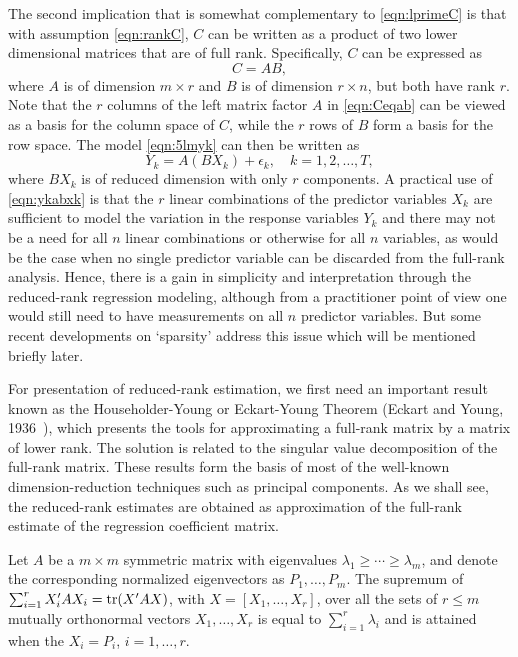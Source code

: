 The second implication that is somewhat complementary to \eqref{eqn:lprimeC} is that with assumption \eqref{eqn:rankC}, $C$ can be written as a product of two lower dimensional matrices that are of full rank. Specifically, $C$ can be expressed as
	\begin{equation} \label{eqn:Ceqab}
	C= AB,
	\end{equation}
where $A$ is of dimension $m \times r$ and $B$ is of dimension $r \times n$, but both have rank $r$. Note that the $r$ columns of the left matrix factor $A$ in \eqref{eqn:Ceqab} can be viewed as a basis for the column space of $C$, while the $r$ rows of $B$ form a basis for the row space. The model \eqref{eqn:5lmyk} can then be written as
	\begin{equation} \label{eqn:ykabxk}
	Y_k= A(BX_k) + \epsilon_k, \quad k= 1, 2, \ldots, T,
	\end{equation}
where $BX_k$ is of reduced dimension with only $r$ components. A practical use of \eqref{eqn:ykabxk} is that the $r$ linear combinations of the predictor variables $X_k$ are sufficient to model the variation in the response variables $Y_k$ and there may not be a need for all $n$ linear combinations or otherwise for all $n$ variables, as would be the case when no single predictor variable can be discarded from the full-rank analysis. Hence, there is a gain in simplicity and interpretation through the reduced-rank regression modeling, although from a practitioner point of view one would still need to have measurements on all $n$ predictor variables. But some recent developments on `sparsity' address this issue which will be mentioned briefly later.


For presentation of reduced-rank estimation, we first need an important result known as the Householder-Young or Eckart-Young Theorem (Eckart and Young, 1936~\cite{eckyoung}), which presents the tools for approximating a full-rank matrix by a matrix of lower rank. The solution is related to the singular value decomposition of the full-rank matrix. These results form the basis of most of the well-known dimension-reduction techniques such as principal components. As we shall see, the reduced-rank estimates are obtained as approximation of the full-rank estimate of the regression coefficient matrix. 


\begin{result} \label{res:2}
Let $A$ be a $m \times m$ symmetric matrix with eigenvalues $\lambda_1 \geq \cdots \geq \lambda_m$, and denote the corresponding normalized eigenvectors as $P_1, \ldots, P_m$. The supremum of $\sum_{i=1}^r X_i' A X_i= \operatorname{tr}(X'AX)$, with $X= [X_1, \ldots, X_r]$, over all the sets of $r \leq m$ mutually orthonormal vectors $X_1, \ldots, X_r$ is equal to $\sum_{i=1}^r \lambda_i$ and is attained when the $X_i=P_i$, $i= 1, \ldots, r$. 
\end{result}


